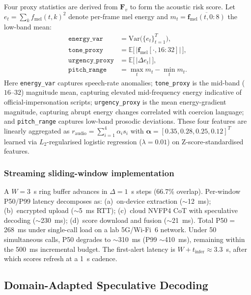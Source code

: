 \documentclass[lettersize,journal]{IEEEtran}
\begin{document}
Four proxy statistics are derived from $\bm{F}_v$ to form the
acoustic risk score.  Let $e_t = \sum_k f_{\mathrm{mel}}(t,k)^2$
denote per-frame mel energy and $m_t = \overline{\bm{f}_{\mathrm{mel}}(t,0\!:\!8)}$
the low-band mean:
\begin{align}
  \texttt{energy\_var}    &= \mathrm{Var}\bigl(\{e_t\}_{t=1}^{T}\bigr),
    \label{eq:ev} \\
  \texttt{tone\_proxy}    &= \mathbb{E}\bigl[\,\bigl|\bm{f}_{\mathrm{mel}}[\cdot,16\!:\!32]\bigr|\,\bigr],
    \label{eq:tp} \\
  \texttt{urgency\_proxy} &= \mathbb{E}\bigl[\,|\Delta e_t|\,\bigr],
    \label{eq:up} \\
  \texttt{pitch\_range}   &= \max_t m_t - \min_t m_t.
    \label{eq:pr}
\end{align}
Here \texttt{energy\_var} captures speech-rate anomalies;
\texttt{tone\_proxy} is the mid-band ($16$--$32$) magnitude mean,
capturing elevated mid-frequency energy indicative of
official-impersonation scripts; \texttt{urgency\_proxy} is the mean
energy-gradient magnitude, capturing abrupt energy changes correlated
with coercion language; and \texttt{pitch\_range} captures low-band
prosodic deviations.  These four features are linearly aggregated as
$r_{\mathrm{audio}} = \sum_{i=1}^4 \alpha_i s_i$ with
$\bm{\alpha}=[0.35,0.28,0.25,0.12]^T$ learned via $L_2$-regularised
logistic regression ($\lambda=0.01$) on Z-score-standardised features.

\subsubsection{Streaming sliding-window implementation}
\label{sec:streaming}

A $W=3$~s ring buffer advances in $\Delta=1$~s steps (66.7\% overlap).
Per-window P50/P99 latency decomposes as:
(a)~on-device extraction ($\sim$12~ms);
(b)~encrypted upload ($\sim$5~ms RTT);
(c)~cloud NVFP4 CoT with speculative decoding ($\sim$230~ms);
(d)~score download and fusion ($\sim$21~ms).
Total P50 = 268~ms under single-call load on a lab 5G/Wi-Fi~6 network.
Under 50 simultaneous calls, P50 degrades to $\sim$310~ms (P99
$\sim$410~ms), remaining within the 500~ms incremental budget.  The
first-alert latency is $W + t_{\mathrm{infer}} \approx 3.3$~s, after
which scores refresh at a 1~s cadence.

\subsection{Domain-Adapted Speculative Decoding}
\end{document}
